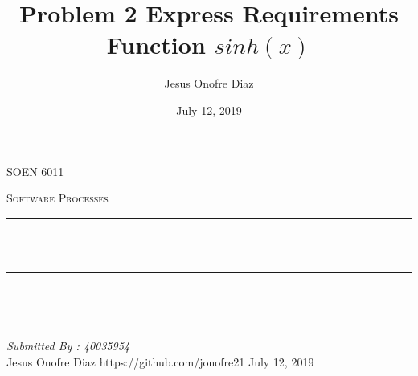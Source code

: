 \documentclass[12pt]{report}
\title{Problem 2 Express Requirements Function $sinh(x)$ }
\author{Jesus Onofre Diaz}
\date{July 12, 2019}
\makeatletter
\let\thetitle\@title
\makeatother
\begin{document}

\begin{titlepage}
	\centering
    \vspace*{0.5 cm}
\begin{center}    \textsc{\Large   SOEN 6011}\\[2.0 cm]	\end{center}%
	\textsc{\Large Software Processes }\\[0.5 cm]				%
	\rule{\linewidth}{0.2 mm} \\[0.4 cm]
	{ \huge \bfseries \thetitle}\\
	\rule{\linewidth}{0.2 mm} \\[1.5 cm]
	
	\begin{minipage}{0.4\textwidth}
		\begin{flushleft} \large
			\end{flushleft}
			\end{minipage}~
			\begin{minipage}{0.4\textwidth}
            
			\begin{flushright} \large
			\emph{Submitted By : 40035954} \\
		Jesus Onofre Diaz
		https://github.com/jonofre21
		\break
			July 12, 2019
		\end{flushright}
	
           
	\end{minipage}\\[2 cm]
	
    
    
    
    
	
\end{titlepage}


\tableofcontents
\pagebreak

\renewcommand{\thesection}{\arabic{section}}
\end{document}
